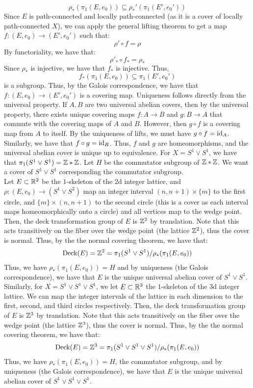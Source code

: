 \documentclass[12pt]{article}
\begin{document}
\begin{solution}
    \[ \rho_*(\pi_1(E, e_0)) \subseteq \rho_*'(\pi_1(E', e_0'))\]
    Since $E$ is path-connected and locally path-connected (as it is a cover of locally path-connected $X$), we can apply the general lifting theorem to get a map $f: (E, e_0) \to (E', e_0')$ such that:
    \[ \rho' \circ f = \rho \]
    By functoriality, we have that:
    \[ \rho'_* \circ f_* = \rho_* \]
    Since $\rho_*$ is injective, we have that $f_*$ is injective. Thus, 
    \[ f_*(\pi_1(E, e_0)) \subseteq \pi_1(E', e_0')\]
    is a subgroup. Thus, by the Galois correspondence, we have that $f: (E, e_0) \to (E', e_0')$ is a covering map. \bbni 
    Uniqueness follows directly from the universal property. If $A, B$ are two universal abelian covers, then by the universal property, there exists unique covering maps $f: A \to B$ and $g: B \to A$ that commute with the covering maps of $A$ and $B$. However, then $g \circ f$ is a covering map from $A$ to itself. By the uniqueness of lifts, we must have $g \circ f = \operatorname{id}_A$. Similarly, we have that $f \circ g = \operatorname{id}_B$. Thus, $f$ and $g$ are homeomorphisms, and the universal abelian cover is unique up to equivalence. \bbni 
    For $X = S^1 \vee S^1$, we have that $\pi_1(S^1 \vee S^1) = \mathbb Z * \mathbb Z$. Let $H$ be the commutator subgroup of $\mathbb Z * \mathbb Z$. We want a cover of $S^1 \vee S^1$ corresponding the commutator subgroup. \\
    Let $E \subset \mathbb R^2$ be the $1$-skeleton of the 2d integer lattice, and $\rho: (E, e_0) \to (S^1 \vee S^2 )$ map an integer interval $(n, n+1) \times \{m\}$ to the first circle, and $\{m\} \times (n, n+1)$ to the second circle (this is a cover as each interval maps homeomorphically onto a circle) and all vertices map to the wedge point. Then, the deck transformation group of $E$ is $\mathbb Z^2$ by translation. Note that this acts transitively on the fiber over the wedge point (the lattice $\mathbb Z^2$), thus the cover is normal. Thus, by the the normal covering theorem, we have that:
     \[ \text{Deck}(E) = \mathbb Z^2 = \pi_1(S^1 \vee S^1)/\rho_*(\pi_1(E, e_0)) \]
     Thus, we have $\rho_*(\pi_1(E, e_0)) = H$ and by uniqueness (the Galois correspondence), we have that $E$ is the unique universal abelian cover of $S^1 \vee S^1$. \bbni
     Similarly, for $X = S^1 \vee S^1 \vee S^1$, we let $E \subset \mathbb R^3$ the $1$-skeleton of the 3d integer lattice. We can map the integer intervals of the lattice in each dimension to the first, second, and third circles respectively. Then, the deck transformation group of $E$ is $\mathbb Z^3$ by translation. Note that this acts transitively on the fiber over the wedge point (the lattice $\mathbb Z^3$), thus the cover is normal. Thus, by the the normal covering theorem, we have that: 
    \[ \text{Deck}(E) = \mathbb Z^3 = \pi_1(S^1 \vee S^1 \vee S^1)/\rho_*(\pi_1(E, e_0)) \]
    Thus, we have $\rho_*(\pi_1(E, e_0)) = H$, the commutator subgroup, and by uniqueness (the Galois correspondence), we have that $E$ is the unique universal abelian cover of $S^1 \vee S^1 \vee S^1$.
\end{solution}
\newpage
\end{document}
